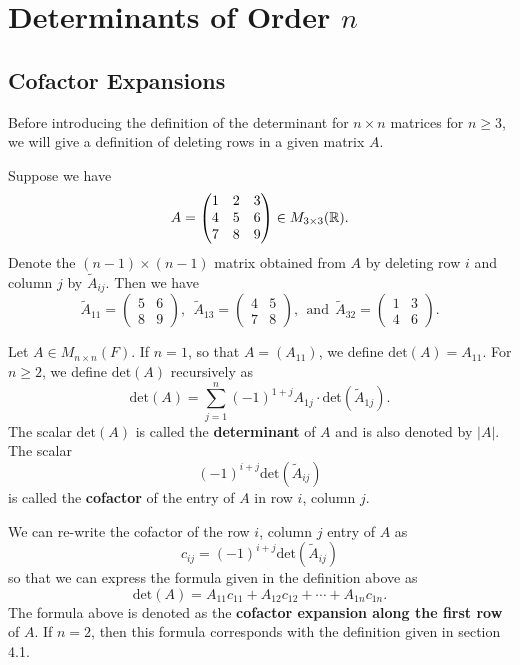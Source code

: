 \section{Determinants of Order \( n \)}


\subsection{Cofactor Expansions}
Before introducing the definition of the determinant for \( n \times n  \) matrices for \( n  \geq 3 \), we will give a definition of deleting rows in a given matrix \( A  \).

Suppose we have 
\[  A = \begin{pmatrix} 
    1 & 2 & 3 \\
    4 &  5 & 6 \\ 
    7 & 8 & 9 
          \end{pmatrix}  \in {M}_{3 \times 3 }(\mathbb{R}). \]
          Denote the \( (n-1) \times (n-1) \) matrix obtained from \( A \) by deleting row \( i  \) and column \( j  \) by \( \tilde{A}_{ij} \). Then we have
          \[  \tilde{A}_{11} = \begin{pmatrix} 
              5 & 6 \\
              8 & 9 
                    \end{pmatrix} , \ \ {\tilde{A}}_{13} = \begin{pmatrix}
              4 & 5 \\
              7 & 8 
          \end{pmatrix}, \ \ \text{and} \ \ {\tilde{A}}_{32} = \begin{pmatrix} 
              1 & 3 \\
              4 & 6 
                    \end{pmatrix}.   \]

\begin{definition}
    Let \( A \in {M}_{n \times n}(F)  \). If \( n =1  \), so that \( A = ({A}_{11}) \), we define \( \text{det}(A) = {A}_{11}  \). For \( n \geq 2  \), we define \( \text{det}(A) \) recursively as 
    \[  \text{det}(A) = \sum_{ j=1  }^{  n } (-1)^{1 + j} {A}_{1j} \cdot \text{det}(\tilde{A}_{1j}). \]
    The scalar \( \text{det}(A) \) is called the \textbf{determinant} of \( A  \) and is also denoted by \( | A |  \). The scalar 
    \[ (-1)^{i + j} \text{det}(\tilde{A}_{ij})   \] is called the \textbf{cofactor} of the entry of \( A  \) in row \( i  \), column \( j  \).
\end{definition}
We can re-write the cofactor of the row \( i \), column \( j \) entry of \( A  \) as 
\[  {c}_{ij} = (-1)^{i+j} \text{det}(\tilde{A}_{ij}) \] so that we can express the formula given in the definition above as 
\[  \text{det}(A) = {A}_{11}{c}_{11} + {A}_{12} {c}_{12} + \cdots + {A}_{1n}{c}_{1n}. \]
The formula above is denoted as the \textbf{cofactor expansion along the first row} of \( A  \). If \(  n = 2  \), then this formula corresponds with the definition given in section 4.1.

